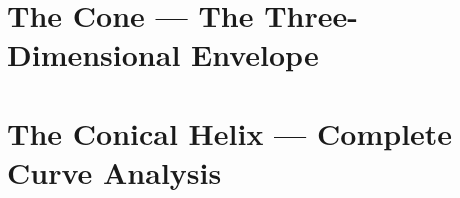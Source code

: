 \documentclass[12pt,a4paper]{report}
\theoremstyle{plain}
\theoremstyle{definition}
\theoremstyle{remark}
\begin{document}






\part{The Cone --- The Three-Dimensional Envelope}
%
%





\part{The Conical Helix --- Complete Curve Analysis}
%
%
\end{document}
